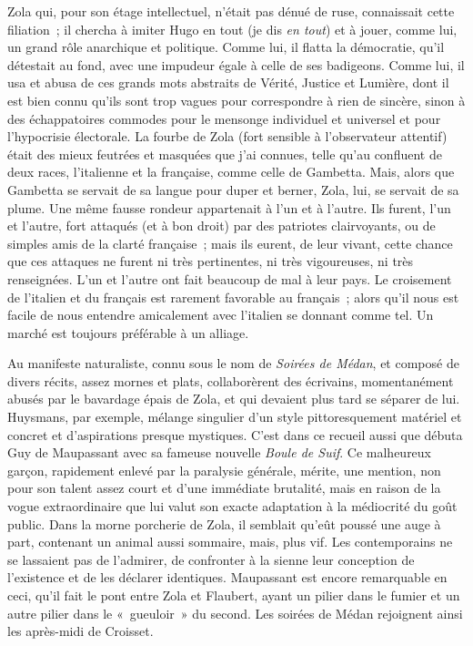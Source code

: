 \documentclass[french,twoside]{book} %
\begin{document}
Zola qui, pour son étage intellectuel, n’était pas dénué de ruse, connaissait cette filiation ; il chercha à imiter Hugo en tout (je dis {\itshape en tout}) et à jouer, comme lui, un grand rôle anarchique et politique. Comme lui, il flatta la démocratie, qu’il détestait au fond, avec une impudeur égale à celle de ses badigeons. Comme lui, il usa et abusa de ces grands mots abstraits de Vérité, Justice et Lumière, dont il est bien connu qu’ils sont trop vagues pour correspondre à rien de sincère, sinon à des échappatoires commodes pour le mensonge individuel et universel et pour l’hypocrisie électorale. La fourbe de Zola (fort sensible à l’observateur attentif) était des mieux feutrées et masquées que j’ai connues, telle qu’au confluent de deux races, l’italienne et la française, comme celle de Gambetta. Mais, alors que Gambetta se servait de sa langue pour duper et berner, Zola, lui, se servait de sa plume. Une même fausse rondeur appartenait à l’un et à l’autre. Ils furent, l’un et l’autre, fort attaqués (et à bon droit) par des patriotes clairvoyants, ou de simples amis de la clarté française ; mais ils eurent, de leur vivant, cette chance que ces attaques ne furent ni très pertinentes, ni très vigoureuses, ni très renseignées. L’un et l’autre ont fait beaucoup de mal à leur pays. Le croisement de l’italien et du français est rarement favorable au français ; alors qu’il nous est facile de nous entendre amicalement avec l’italien se donnant comme tel. Un marché est toujours préférable à un alliage.\par
Au manifeste naturaliste, connu sous le nom de {\itshape Soirées de Médan}, et composé de divers récits, assez mornes et plats, collaborèrent des écrivains, momentanément abusés par le bavardage épais de Zola, et qui devaient plus tard se séparer de lui. Huysmans, par exemple, mélange singulier d’un style pittoresquement matériel et concret et d’aspirations presque mystiques. C’est dans ce recueil aussi que débuta Guy de Maupassant avec sa fameuse nouvelle {\itshape Boule de Suif}. Ce malheureux garçon, rapidement enlevé par la paralysie générale, mérite, une mention, non pour son talent assez court et d’une immédiate brutalité, mais en raison de la vogue extraordinaire que lui valut son exacte adaptation à la médiocrité du goût public. Dans la morne porcherie de Zola, il semblait qu’eût poussé une auge à part, contenant un animal aussi sommaire, mais, plus vif. Les contemporains ne se lassaient pas de l’admirer, de confronter à la sienne leur conception de l’existence et de les déclarer identiques. Maupassant est encore remarquable en ceci, qu’il fait le pont entre Zola et Flaubert, ayant un pilier dans le fumier et un autre pilier dans le « gueuloir » du second. Les soirées de Médan rejoignent ainsi les après-midi de Croisset.\par
\end{document}
